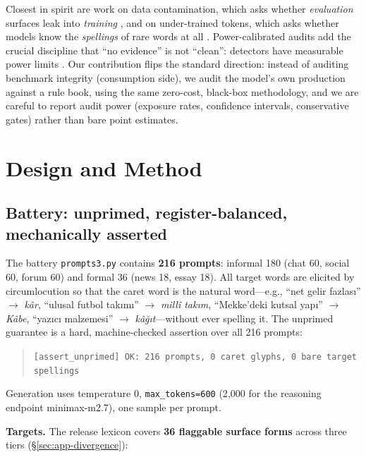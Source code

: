 \documentclass[11pt]{article}
\begin{document}
Closest in spirit are work on data contamination, which asks whether \emph{evaluation} surfaces leak into \emph{training} \cite{yao2024,ahuja2024,arabic2026,transpcards2024,powercal2026}, and on under-trained tokens, which asks whether models know the \emph{spellings} of rare words at all \cite{magikarp2024}. Power-calibrated audits add the crucial discipline that ``no evidence'' is not ``clean'': detectors have measurable power limits \cite{powercal2026}. Our contribution flips the standard direction: instead of auditing benchmark integrity (consumption side), we audit the model's own production against a rule book, using the same zero-cost, black-box methodology, and we are careful to report audit power (exposure rates, confidence intervals, conservative gates) rather than bare point estimates.

\section{Design and Method}

\subsection{Battery: unprimed, register-balanced, mechanically asserted}

The battery \texttt{prompts3.py} contains \textbf{216 prompts}: informal 180 (chat 60, social 60, forum 60) and formal 36 (news 18, essay 18). All target words are elicited by circumlocution so that the caret word is the natural word---e.g., ``net gelir fazlas{\i}'' $\rightarrow$ \emph{k{\^a}r}, ``ulusal futbol tak{\i}m{\i}'' $\rightarrow$ \emph{mill{\^i} tak{\i}m}, ``Mekke'deki kutsal yap{\i}'' $\rightarrow$ \emph{K{\^a}be}, ``yaz{\i}c{\i} malzemesi'' $\rightarrow$ \emph{k{\^a}{\u{g}}{\i}t}---without ever spelling it. The unprimed guarantee is a hard, machine-checked assertion over all 216 prompts:

\begin{quote}
\small \texttt{[assert\_unprimed] OK: 216 prompts, 0 caret glyphs, 0 bare target spellings}
\end{quote}

Generation uses temperature 0, \texttt{max\_tokens=600} (2{,}000 for the reasoning endpoint minimax-m2.7), one sample per prompt.

\textbf{Targets.} The release lexicon covers \textbf{36 flaggable surface forms} across three tiers (\S\ref{sec:app-divergence}):
\end{document}
